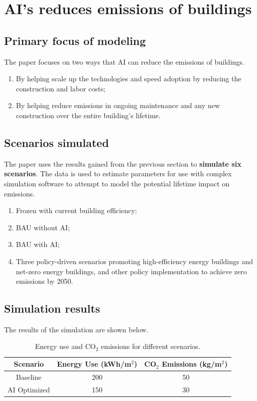 \documentclass[conference,a4paper]{IEEEtran}
\begin{document}
\section*{AI's reduces emissions of buildings}


\subsection*{Primary focus of modeling}

The paper focuses on two ways that AI can reduce the emissions of buildings.

\begin{enumerate}
    \item By helping scale up the technologies and speed adoption by reducing the construction and labor costs;
    \item By helping reduce emissions in ongoing maintenance and any new construction over the entire building's lifetime.
\end{enumerate}

\subsection*{Scenarios simulated}
The paper uses the results gained from the previous section to \textbf{simulate six scenarios}. The data is used to estimate parameters for use with complex simulation software to attempt to model the potential lifetime impact on emissions.
\begin{enumerate}
    \item Frozen with current building efficiency;
    \item BAU without AI;
    \item BAU with AI;
    \item Three policy-driven scenarios promoting high-efficiency energy buildings and net-zero energy buildings, and other policy implementation to achieve zero emissions by 2050.
\end{enumerate}


\subsection*{Simulation results}
The results of the simulation are shown below.

\begin{table}
\centering
\begin{tabular}{|c|c|c|}
\hline
\textbf{Scenario} & \textbf{Energy Use (kWh/m$^2$)} & \textbf{CO$_2$ Emissions (kg/m$^2$)} \\
\hline 
Baseline & 200 & 50 \\
\hline
AI Optimized & 150 & 30 \\
\hline
\end{tabular}
\caption{Energy use and CO$_2$ emissions for different scenarios.}
\label{tab:energy-emissions}
\end{table}
\end{document}
